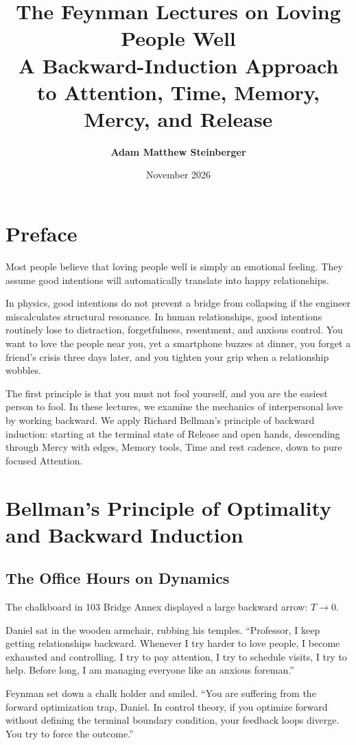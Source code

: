 \documentclass[11pt]{report}
\title{\Huge\textbf{The Feynman Lectures on Loving People Well}\\
\Large A Backward-Induction Approach to Attention, Time, Memory, Mercy, and Release}
\author{\textbf{Adam Matthew Steinberger}}
\date{November 2026}
\begin{document}
\maketitle

\tableofcontents
\newpage

\chapter*{Preface}

Most people believe that loving people well is simply an emotional feeling. They assume good intentions will automatically translate into happy relationships.

In physics, good intentions do not prevent a bridge from collapsing if the engineer miscalculates structural resonance. In human relationships, good intentions routinely lose to distraction, forgetfulness, resentment, and anxious control. You want to love the people near you, yet a smartphone buzzes at dinner, you forget a friend's crisis three days later, and you tighten your grip when a relationship wobbles.

The first principle is that you must not fool yourself, and you are the easiest person to fool. In these lectures, we examine the mechanics of interpersonal love by working backward. We apply Richard Bellman's principle of backward induction: starting at the terminal state of Release and open hands, descending through Mercy with edges, Memory tools, Time and rest cadence, down to pure focused Attention.

\chapter{Bellman's Principle of Optimality and Backward Induction}

\section{The Office Hours on Dynamics}
The chalkboard in 103 Bridge Annex displayed a large backward arrow: $T \to 0$.

Daniel sat in the wooden armchair, rubbing his temples. ``Professor, I keep getting relationships backward. Whenever I try harder to love people, I become exhausted and controlling. I try to pay attention, I try to schedule visits, I try to help. Before long, I am managing everyone like an anxious foreman.''

Feynman set down a chalk holder and smiled. ``You are suffering from the forward optimization trap, Daniel. In control theory, if you optimize forward without defining the terminal boundary condition, your feedback loops diverge. You try to force the outcome.''
\end{document}
